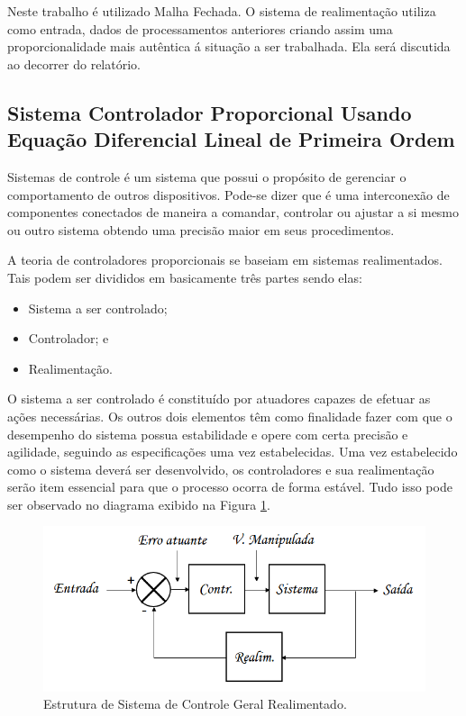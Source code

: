 \documentclass[portugues, brazil, a4paper,12pt]{article}
\begin{document}
			Neste trabalho é utilizado Malha Fechada. O sistema de realimentação utiliza como entrada, dados de processamentos anteriores criando assim uma proporcionalidade mais autêntica á situação a ser trabalhada. Ela será discutida ao decorrer do relatório.


	\subsection{Sistema Controlador Proporcional Usando Equação Diferencial Lineal de Primeira Ordem} \label{sec:eql1}
		Sistemas de controle é um sistema que possui o propósito de gerenciar o comportamento de outros dispositivos. Pode-se dizer que é uma interconexão de componentes conectados de maneira a comandar, controlar ou ajustar a si mesmo ou outro sistema obtendo uma precisão maior em seus procedimentos.

		A teoria de controladores proporcionais se baseiam em sistemas realimentados. Tais podem ser divididos em basicamente três partes sendo elas:

		\begin{itemize}
			\item Sistema a ser controlado;
			\item Controlador; e
			\item Realimentação.
		\end{itemize}

		O sistema a ser controlado é constituído por atuadores capazes de efetuar as ações necessárias. Os outros dois elementos têm como finalidade fazer com que o desempenho do sistema possua estabilidade e opere com certa precisão e agilidade, seguindo as especificações uma vez estabelecidas. Uma vez estabelecido como o sistema deverá ser desenvolvido, os controladores e sua realimentação serão item essencial para que o processo ocorra de forma estável. Tudo isso pode ser observado no diagrama exibido na Figura \ref{fig:estrutura_sistema_controle}.

		\begin{figure}[h]
			\centering
			\includegraphics[width=\linewidth]{img/math-realimentacao.png}
			\caption{Estrutura de Sistema de Controle Geral Realimentado.}
			\label{fig:estrutura_sistema_controle}
		\end{figure}
\end{document}
